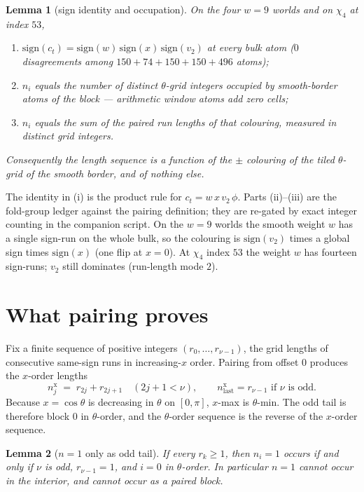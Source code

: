 \documentclass[11pt]{article}
\newtheorem{lemma}{Lemma}
\theoremstyle{remark}
\begin{document}
\begin{lemma}[sign identity and occupation]\label{lem:n-from-sign}
On the four $w=9$ worlds and on $\chi_4$ at index $53$,
\begin{enumerate}
\item $\mathrm{sign}(c_t)=\mathrm{sign}(w)\,\mathrm{sign}(x)\,\mathrm{sign}(v_2)$
at every bulk atom ($0$ disagreements among $150+74+150+150+496$
atoms);
\item $n_i$ equals the number of distinct $\theta$-grid integers occupied
by \emph{smooth-border} atoms of the block --- arithmetic window atoms
add zero cells;
\item $n_i$ equals the sum of the paired run lengths of that colouring,
measured in distinct grid integers.
\end{enumerate}
Consequently the length sequence is a function of the $\pm$ colouring
of the tiled $\theta$-grid of the smooth border, and of nothing else.
\end{lemma}

The identity in (i) is the product rule for $c_t=w\,x\,v_2\,\phi$.
Parts (ii)--(iii) are the fold-group ledger against the pairing
definition; they are re-gated by exact integer counting in the
companion script.  On the $w=9$ worlds the smooth weight $w$ has a
single sign-run on the whole bulk, so the colouring is
$\mathrm{sign}(v_2)$ times a global sign times $\mathrm{sign}(x)$
(one flip at $x=0$).  At $\chi_4$ index $53$ the weight $w$ has
fourteen sign-runs; $v_2$ still dominates (run-length mode $2$).

\section{What pairing proves}\label{sec:pair}

Fix a finite sequence of positive integers $(r_0,\dots,r_{\nu-1})$,
the grid lengths of consecutive same-sign runs in increasing-$x$
order.  Pairing from offset $0$ produces the $x$-order lengths
\[
n^{\mathrm{x}}_{j}
 \;=\;
 r_{2j}+r_{2j+1}
 \quad(2j+1<\nu),\qquad
 n^{\mathrm{x}}_{\mathrm{last}}=r_{\nu-1}
 \text{ if $\nu$ is odd}.
\]
Because $x=\cos\theta$ is decreasing in $\theta$ on $[0,\pi]$,
$x$-max is $\theta$-min.  The odd tail is therefore block $0$ in
$\theta$-order, and the $\theta$-order sequence is the reverse of the
$x$-order sequence.

\begin{lemma}[$n=1$ only as odd tail]\label{lem:n1-tail}
If every $r_k\ge 1$, then $n_i=1$ occurs if and only if $\nu$ is odd,
$r_{\nu-1}=1$, and $i=0$ in $\theta$-order.  In particular $n=1$ cannot
occur in the interior, and cannot occur as a paired block.
\end{lemma}
\end{document}
